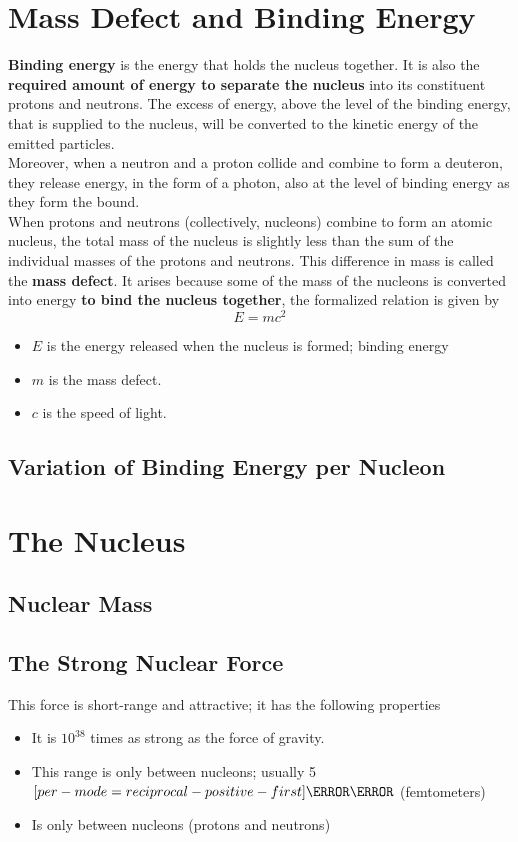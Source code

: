 \documentclass[a4paper,12pt]{article}
\let\oldsection\section
\renewcommand\section{\clearpage\oldsection}
\let\oldsi\si
\renewcommand{\si}[1]{\oldsi[per-mode=reciprocal-positive-first]{#1}}
\newcommand{\lb}{\\[8pt]}
\begin{document}
\section{Mass Defect and Binding Energy}

\textbf{Binding energy} is the energy that holds the nucleus together. It is also the \textbf{required amount of energy to separate the nucleus} into its constituent protons and neutrons. The excess of energy, above the level of the binding energy, that is supplied to the nucleus, will be converted to the kinetic energy of the emitted particles.\lb
Moreover, when a neutron and a proton collide and combine to form a deuteron, they release energy, in the form of a photon, also at the level of binding energy as they form the bound.\lb
When protons and neutrons (collectively, nucleons) combine to form an atomic nucleus, the total mass of the nucleus is slightly less than the sum of the individual masses of the protons and neutrons. This difference in mass is called the \textbf{mass defect}. It arises because some of the mass of the nucleons is converted into energy \textbf{to bind the nucleus together}, the formalized relation is given by
$$E = mc^2$$
\begin{itemize}
  \item $E$ is the energy released when the nucleus is formed; binding energy
  \item $m$ is the mass defect.
  \item $c$ is the speed of light.
\end{itemize}


\subsection{Variation of Binding Energy per Nucleon}

\section{The Nucleus}

\subsection{Nuclear Mass}

\subsection{The Strong Nuclear Force}

This force is short-range and attractive; it has the following properties
\begin{itemize}
  \item It is $10^{38}$ times as strong as the force of gravity.
  \item This range is only between nucleons; usually 5 $\si{\femto\m}$ (femtometers)
  \item Is only between nucleons (protons and neutrons)
\end{itemize}
\end{document}
